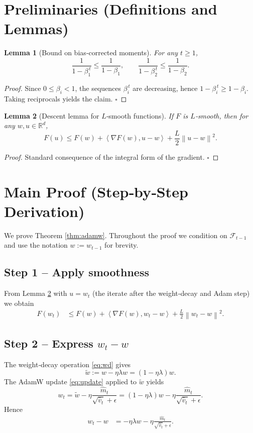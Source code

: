 \documentclass{article}
\newtheorem{lemma}{Lemma}
\newcommand{\R}{\mathbb{R}}
\newcommand{\norm}[1]{\left\lVert #1 \right\rVert}
\newcommand{\ip}[2]{\left\langle #1,#2 \right\rangle}
\begin{document}
\section*{Preliminaries (Definitions and Lemmas)}
\begin{lemma}[Bound on bias‑corrected moments]\label{lem:bc}
For any $t\ge 1$,
\[
    \frac{1}{1-\beta_1^{\,t}} \le \frac{1}{1-\beta_1},\qquad
    \frac{1}{1-\beta_2^{\,t}} \le \frac{1}{1-\beta_2}.
\]
\end{lemma}
\begin{proof}
Since $0\le\beta_i<1$, the sequences $\beta_i^{\,t}$ are decreasing, hence $1-\beta_i^{\,t}\ge 1-\beta_i$. Taking reciprocals yields the claim. \hfill $\square$
\end{proof}

\begin{lemma}[Descent lemma for $L$‑smooth functions]\label{lem:smooth}
If $F$ is $L$‑smooth, then for any $w,u\in\R^d$,
\[
    F(u) \le F(w) + \ip{\nabla F(w)}{u-w} + \frac{L}{2}\norm{u-w}^2 .
\]
\end{lemma}
\begin{proof}
Standard consequence of the integral form of the gradient. \hfill $\square$
\end{proof}

\section{Main Proof (Step‑by‑Step Derivation)}
\label{sec:proof}
We prove Theorem \ref{thm:adamw}. Throughout the proof we condition on $\mathcal{F}_{t-1}$ and use the notation $w:=w_{t-1}$ for brevity.

\subsection*{Step 1 – Apply smoothness}
From Lemma \ref{lem:smooth} with $u = w_t$ (the iterate after the weight‑decay and Adam step) we obtain
\begin{align}
    F(w_t) &\le F(w) + \ip{\nabla F(w)}{w_t-w} + \frac{L}{2}\norm{w_t-w}^2 .
    \tag{S1}
\end{align}

\subsection*{Step 2 – Express $w_t-w$}
The weight‑decay operation \eqref{eq:wd} gives
\[
    \tilde w := w - \eta\lambda w = (1-\eta\lambda) w .
\]
The AdamW update \eqref{eq:update} applied to $\tilde w$ yields
\[
    w_t = \tilde w - \eta \frac{\hat m_t}{\sqrt{\hat v_t}+\epsilon}
        = (1-\eta\lambda) w - \eta \frac{\hat m_t}{\sqrt{\hat v_t}+\epsilon}.
\]
Hence
\begin{align}
    w_t-w &= -\eta\lambda w - \eta \frac{\hat m_t}{\sqrt{\hat v_t}+\epsilon}.
    \tag{S2}
\end{align}
\end{document}
